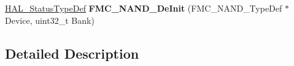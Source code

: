 \begin{DoxyCompactItemize}
\item 
\hyperlink{stm32f4xx__hal__def_8h_a63c0679d1cb8b8c684fbb0632743478f}{H\+A\+L\+\_\+\+Status\+Type\+Def} {\bfseries F\+M\+C\+\_\+\+N\+A\+N\+D\+\_\+\+De\+Init} (F\+M\+C\+\_\+\+N\+A\+N\+D\+\_\+\+Type\+Def $\ast$Device, uint32\+\_\+t Bank)\hypertarget{group___f_m_c___l_l___n_a_n_d___private___functions___group1_gaa08341e94ce1b34d8008ca45b162c8b8}{}\label{group___f_m_c___l_l___n_a_n_d___private___functions___group1_gaa08341e94ce1b34d8008ca45b162c8b8}

\end{DoxyCompactItemize}


\subsection{Detailed Description}
